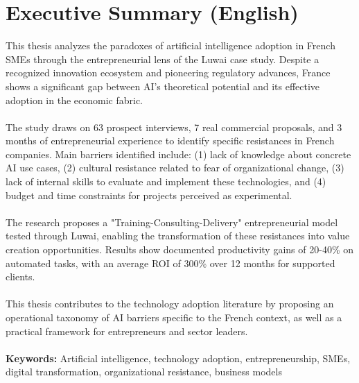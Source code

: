 \newpage
\section*{Executive Summary (English)}

This thesis analyzes the paradoxes of artificial intelligence adoption in French SMEs through the entrepreneurial lens of the Luwai case study. Despite a recognized innovation ecosystem and pioneering regulatory advances, France shows a significant gap between AI's theoretical potential and its effective adoption in the economic fabric.
\\\\
The study draws on 63 prospect interviews, 7 real commercial proposals, and 3 months of entrepreneurial experience to identify specific resistances in French companies. Main barriers identified include: (1) lack of knowledge about concrete AI use cases, (2) cultural resistance related to fear of organizational change, (3) lack of internal skills to evaluate and implement these technologies, and (4) budget and time constraints for projects perceived as experimental.
\\\\
The research proposes a "Training-Consulting-Delivery" entrepreneurial model tested through Luwai, enabling the transformation of these resistances into value creation opportunities. Results show documented productivity gains of 20-40\% on automated tasks, with an average ROI of 300\% over 12 months for supported clients.
\\\\
This thesis contributes to the technology adoption literature by proposing an operational taxonomy of AI barriers specific to the French context, as well as a practical framework for entrepreneurs and sector leaders.
\\\\
\textbf{Keywords:} Artificial intelligence, technology adoption, entrepreneurship, SMEs, digital transformation, organizational resistance, business models
